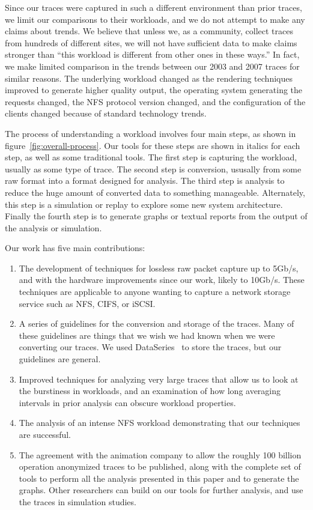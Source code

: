 Since our traces were captured in such a different environment than
prior traces, we limit our comparisons to their workloads, and we
do not attempt to make any claims about trends.  We believe that
unless we, as a community, collect traces from hundreds of different
sites, we will not have sufficient data to make claims stronger than
``this workload is different from other ones in these ways.''  In
fact, we make limited comparison in the trends between our 2003 and
2007 traces for similar reasons.  The underlying workload changed
as the rendering techniques improved to generate higher quality output,
the operating system generating the requests changed, the NFS
protocol version changed, and the configuration of the clients 
changed because of standard technology trends.

The process of understanding a workload involves four main
steps, as shown in figure~\ref{fig:overall-process}.  Our tools for
these steps are shown in italics for each step, as well as some
traditional tools.  The first step is capturing the workload, usually
as some type of trace.  The second step is conversion, ususally from
some raw format into a format designed for analysis.  The third step
is analysis to reduce the huge amount of converted data to
something manageable.  Alternately, this step is a simulation or replay to
explore some new system architecture.  Finally the fourth step is to
generate graphs or textual reports from the output of the analysis or
simulation.

Our work has five main contributions:

\begin{enumerate}
\item The development of techniques for lossless raw packet capture up to
5Gb/s, and with the hardware improvements since our work, likely to
10Gb/s.  These techniques are applicable to anyone wanting to capture
a network storage service such as NFS, CIFS, or iSCSI.

\item A series of guidelines for the conversion and storage of the
traces.  Many of these guidelines are things that we wish we had known
when we were converting our traces.  We used
DataSeries~\cite{DataSeriesOSR2009} to store the traces, but our
guidelines are general.

\item Improved techniques for analyzing very large traces that allow
us to look at the burstiness in workloads, and an examination of how
long averaging intervals in prior analysis can obscure workload
properties.

\item The analysis of an intense NFS workload demonstrating that our
techniques are successful.

\item The agreement with the animation company to allow the roughly
100 billion operation anonymized traces to be published, along with
the complete set of tools to perform all the analysis presented in
this paper and to generate the graphs.  Other
researchers can build on our tools for further analysis, and use
the traces in simulation studies.
\end{enumerate}

